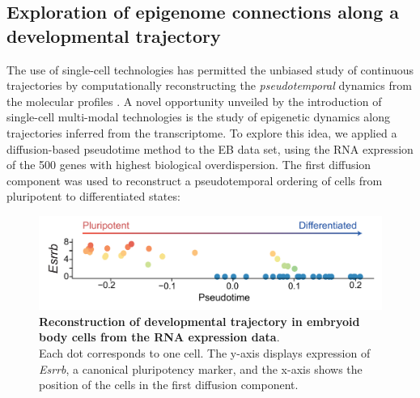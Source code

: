 

\subsection{Exploration of epigenome connections along a developmental trajectory}

The use of single-cell technologies has permitted the unbiased study of continuous trajectories by computationally reconstructing the \textit{pseudotemporal} dynamics from the molecular profiles \cite{Trapnell2014,Haghverdi2016,Saelens2018}. A novel opportunity unveiled by the introduction of single-cell multi-modal technologies is the study of epigenetic dynamics along trajectories inferred from the transcriptome. To explore this idea, we applied a diffusion-based pseudotime method\cite{Haghverdi2016} to the EB data set, using the RNA expression of the 500 genes with highest biological overdispersion\cite{Lun2016b}. The first diffusion component was used to reconstruct a pseudotemporal ordering of cells from pluripotent to differentiated states:

\begin{figure}[H]
	\centering
	\includegraphics[width=0.75\linewidth]{scNMT_pseudotime}
	\caption[]{\textbf{Reconstruction of developmental trajectory in embryoid body cells from the RNA expression data}.\\
	Each dot corresponds to one cell. The y-axis displays expression of \textit{Esrrb}, a canonical pluripotency marker, and the x-axis shows the position of the cells in the first diffusion component.}
	\label{fig:scnmt_pseudotime}
\end{figure}


